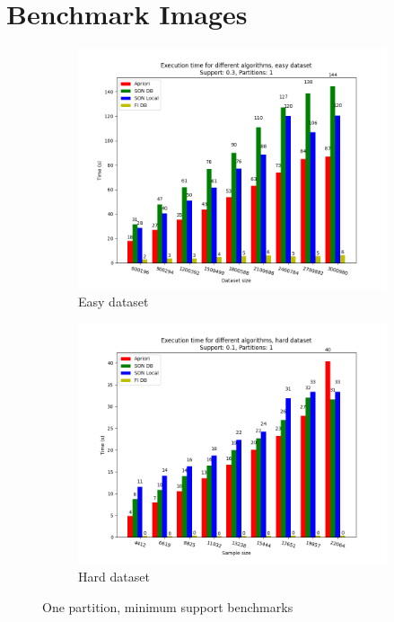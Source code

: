 \documentclass[a4paper]{article}
\begin{document}
	\newpage
	\section{Benchmark Images}

	\begin{figure}[h!]
		\centering
		\begin{subfigure}[b]{\textwidth}
			\centering
			\includegraphics[width=.9\textwidth]{1_easy_0,3_1_dataset.png}
         	\caption{Easy dataset}
         	\label{fig:1par-minsup-a}
		\end{subfigure}
		\begin{subfigure}[b]{\textwidth}
			\centering
			\includegraphics[width=.9\textwidth]{1_hard_0,1_1_dataset.png}
         	\caption{Hard dataset}
         	\label{fig:1par-minsup-b}
		\end{subfigure}

		\caption{One partition, minimum support benchmarks}
		\label{fig:1par-minsup}
		
	\end{figure}
	
\end{document}
